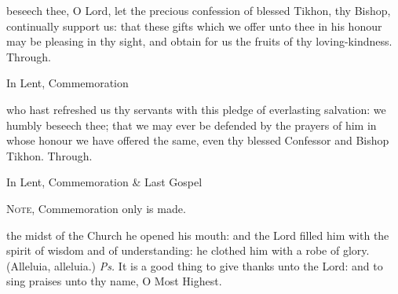 
\vspace{-0.2\baselineskip}

\secret

\vspace{-0.13\baselineskip}

 beseech thee, O Lord, let the precious confession of blessed Tikhon, thy Bishop, continually support us: that these gifts which we offer unto thee in his honour may be pleasing in thy sight, and obtain for us the fruits of thy loving-kindness. Through.

\begin{rubric}
    In Lent, Commemoration %
\end{rubric}


\vspace{-0.2\baselineskip}

\postcommunion

\vspace{-0.13\baselineskip}

 who hast refreshed us thy servants with this pledge of everlasting salvation: we humbly beseech thee; that we may ever be defended by the prayers of him in whose honour we have offered the same, even thy blessed Confessor and Bishop Tikhon. Through.

\begin{rubric}
    In Lent, Commemoration \& Last Gospel 
\end{rubric}


\clearpage
{}

\begin{rubric}
	\textsc{Note,} Commemoration only is made.
\end{rubric}

\introit
{} the midst of the Church he opened his mouth: and the Lord filled him with the spirit of wisdom and of understanding: he clothed him with a robe of glory. (Alleluia, alleluia.) \textit{Ps.} It is  a good thing to give thanks unto the Lord: and to sing praises unto thy name, O Most Highest.


